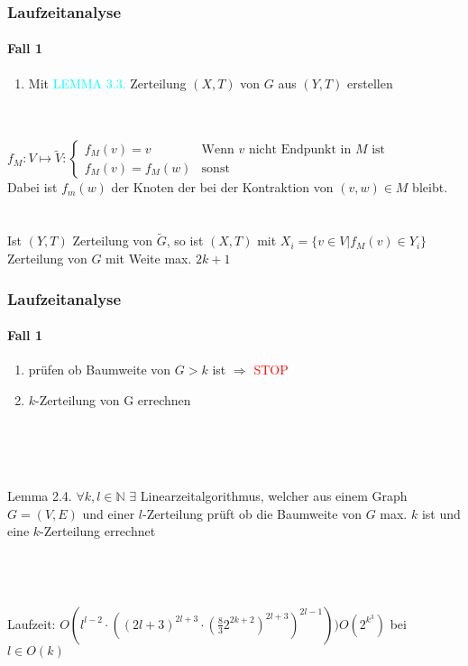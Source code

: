\begin{frame}
\frametitle{Laufzeitanalyse}
\framesubtitle{Fall 1}

\begin{enumerate}
	\item[4.] Mit \textcolor{cyan}{LEMMA 3.3.} Zerteilung $(X,T)$ von $G$ aus $(Y,T)$ erstellen %
\end{enumerate}
\ \\
\ \\
$
f_M: V \mapsto \widetilde{V}:
\begin{cases} %
	f_M(v) = v &\text{Wenn } v \text{ nicht Endpunkt in } M \text{ ist} \\
	f_M(v) = f_M(w) &\text{sonst}
\end{cases}$\\
Dabei ist $f_m(w)$ der Knoten der bei der Kontraktion von $(v,w) \in M$ bleibt. \\
\ \\
\ \\
Ist $(Y,T)$ Zerteilung von $\widetilde{G}$, so ist $(X,T)$ mit $X_i = \{ v \in V | f_M(v) \in Y_i \}$ Zerteilung von $G$ mit Weite max. $2k+1$
\end{frame}


\begin{frame}
\frametitle{Laufzeitanalyse}
\framesubtitle{Fall 1}

\begin{enumerate}
	\item[5.] prüfen ob Baumweite von $G > k$ ist $\Rightarrow$ \textcolor{red}{STOP}
	\item[5.1.] $k$-Zerteilung von G errechnen

\end{enumerate}
\ \\
\ \\
\ \\

\begin{KITinfoblock}{Lemma 2.4.}
$\forall k,l \in \mathbb{N}$ $\exists$ Linearzeitalgorithmus, welcher aus einem Graph $G=(V,E)$ und einer $l$-Zerteilung prüft ob die Baumweite von $G$ max. $k$ ist und eine $k$-Zerteilung errechnet
\end{KITinfoblock}

\ \\
\ \\
\ \\
Laufzeit: $O(l^{l-2} \cdot ((2l+3)^{2l+3} \cdot (\frac{8}{3} 2^{2k+2})^{2l+3})^{2l-1}))  O(2^{k^3})$ bei $l \in O(k)$
\end{frame}